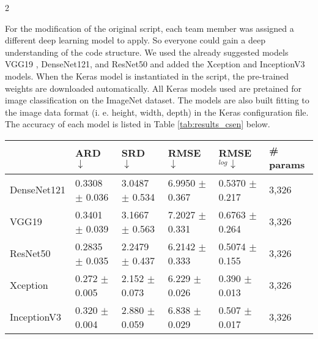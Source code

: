 \documentclass[a4paper, 11pt]{article}
\begin{document}
\begin{multicols}{2}
\begin{flushleft}
For the modification of the original script, each team member was assigned a different deep learning model to apply. So everyone could gain a deep understanding of the code structure. We used the already suggested models VGG19 \cite{VGG}, DenseNet121\cite{Dense}, and ResNet50 \cite{RES} and added the Xception \cite{DBLP:journals/corr/Chollet16a} and InceptionV3 \cite{DBLP:journals/corr/SzegedyVISW15} models. When the Keras model is instantiated in the script, the pre-trained weights are downloaded automatically. All Keras models used are pretained for image classification on the ImageNet dataset. The models are also built fitting to the image data format (i. e. height, width, depth) in the Keras configuration file.
The accuracy of each model is listed in Table \ref{tab:results_csen} below.
\begin{table*}
\centering
\begin{subtable}[c]{\linewidth}
\centering
{}
\footnotesize
    \begin{tabular}{|l|l|l|l|l|l|}
    \hline
         & ARD $\downarrow$ & SRD $\downarrow$ & RMSE  $\downarrow$ & RMSE$_{log} \downarrow$ & \# params \\ \hline
        DenseNet121 & 0.3308 $\pm$ 0.036 & 3.0487 $\pm$ 0.534 & 6.9950 $\pm$ 0.367 & 0.5370 $\pm$ 0.217 & 3,326 \\
        VGG19 & 0.3401 $\pm$ 0.039 & 3.1667 $\pm$ 0.563 & 7.2027 $\pm$ 0.331 & 0.6763 $\pm$ 0.264 & 3,326 \\
        ResNet50 & 0.2835 $\pm$ 0.035 & 2.2479 $\pm$ 0.437 & 6.2142 $\pm$ 0.333 & 0.5074 $\pm$ 0.155 & 3,326 \\
        Xception & 0.272 $\pm$ 0.005 & 2.152 $\pm$ 0.073 & 6.229 $\pm$ 0.026 & 0.390 $\pm$ 0.013 & 3,326 \\
        InceptionV3 & 0.320 $\pm$ 0.004 & 2.880 $\pm$ 0.059 & 6.838 $\pm$ 0.029 & 0.507 $\pm$ 0.017 & 3,326 \\
        
        \hline
    \end{tabular}
\label{tab:results_csen}
\end{subtable}
\end{table*}



\end{flushleft}
\end{multicols}
\end{document}
